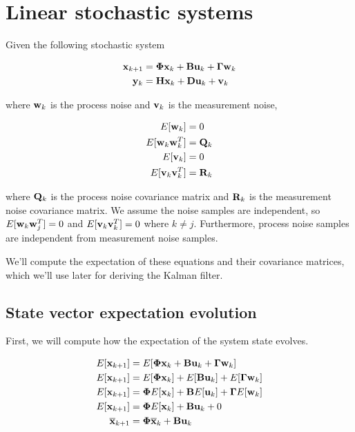 \section{Linear stochastic systems}

Given the following stochastic system

\begin{align*}
  \mathbf{x}_{k+1} &= \mathbf{\Phi}\mathbf{x}_k + \mathbf{B}\mathbf{u}_k +
    \mathbf{\Gamma}\mathbf{w}_k \\
  \mathbf{y}_k &= \mathbf{H}\mathbf{x}_k + \mathbf{D}\mathbf{u}_k + \mathbf{v}_k
\end{align*}

where $\mathbf{w}_k$ is the process noise and $\mathbf{v}_k$ is the measurement noise,
 

\begin{align*}
  E[\mathbf{w}_k] &= 0 \\
  E[\mathbf{w}_k\mathbf{w}_k^T] &= \mathbf{Q}_k \\
  E[\mathbf{v}_k] &= 0 \\
  E[\mathbf{v}_k\mathbf{v}_k^T] &= \mathbf{R}_k
\end{align*}

where $\mathbf{Q}_k$ is the process noise covariance matrix and $\mathbf{R}_k$ is the
measurement noise covariance matrix. We assume the noise samples are
independent, so $E[\mathbf{w}_k\mathbf{w}_j^T] = 0$ and $E[\mathbf{v}_k\mathbf{v}_k^T] = 0$
where $k \neq j$. Furthermore, process noise samples are independent from
measurement noise samples.

We'll compute the expectation of these equations and their covariance matrices,
which we'll use later for deriving the Kalman filter.

\subsection{State vector expectation evolution}

First, we will compute how the expectation of the \gls{system} \gls{state}
evolves.

\begin{align*}
  E[\mathbf{x}_{k+1}] &= E[\mathbf{\Phi}\mathbf{x}_k + \mathbf{B}\mathbf{u}_k +
    \mathbf{\Gamma}\mathbf{w}_k] \\
  E[\mathbf{x}_{k+1}] &= E[\mathbf{\Phi}\mathbf{x}_k] + E[\mathbf{B}\mathbf{u}_k] +
    E[\mathbf{\Gamma}\mathbf{w}_k] \\
  E[\mathbf{x}_{k+1}] &= \mathbf{\Phi}E[\mathbf{x}_k] + \mathbf{B}E[\mathbf{u}_k] +
    \mathbf{\Gamma}E[\mathbf{w}_k] \\
  E[\mathbf{x}_{k+1}] &= \mathbf{\Phi}E[\mathbf{x}_k] + \mathbf{B}\mathbf{u}_k + 0 \\
  \overline{\mathbf{x}}_{k+1} &= \mathbf{\Phi}\overline{\mathbf{x}}_k +
    \mathbf{B}\mathbf{u}_k \\
\end{align*}

